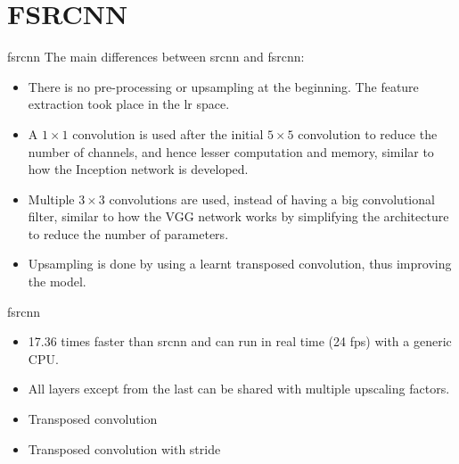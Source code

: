\documentclass[hyperref={unicode}, xcolor=dvipsnames, t]{beamer}
\begin{document}
\section{FSRCNN}
\begin{frame}{\texorpdfstring{\gls{fsrcnn}}{Lg}}
    The main differences between \gls{srcnn} and \gls{fsrcnn}:
    \begin{itemize}
        \item There is no pre-processing or upsampling at the beginning. The feature extraction took place in the \alert{\gls{lr} space}.
        \item A $1\times1$ convolution is used after the initial $5\times5$ convolution to reduce the number of channels, and hence lesser computation and memory, similar to how the Inception\cite{inception} network is developed.
        \item Multiple $3\times3$ convolutions are used, instead of having a big convolutional filter, similar to how the VGG network works by simplifying the architecture to reduce the number of parameters.
        \item Upsampling is done by using a learnt transposed convolution, thus improving the model.
    \end{itemize}
\end{frame}

\begin{frame}{\texorpdfstring{\gls{fsrcnn}}{Lg}}
     \begin{itemize}
        \item 17.36 times faster than \gls{srcnn} and can run in real time (24 fps) with a generic CPU.
        \item All layers except from the last can be shared with multiple upscaling factors.
        \item Transposed convolution \href{https://i.stack.imgur.com/YyCu2.gif}{}\cite{conv_operations}
        \item Transposed convolution with stride \href{https://i.stack.imgur.com/f2RiP.gif}{}\cite{conv_operations}
    \end{itemize}
\end{frame}
\end{document}
